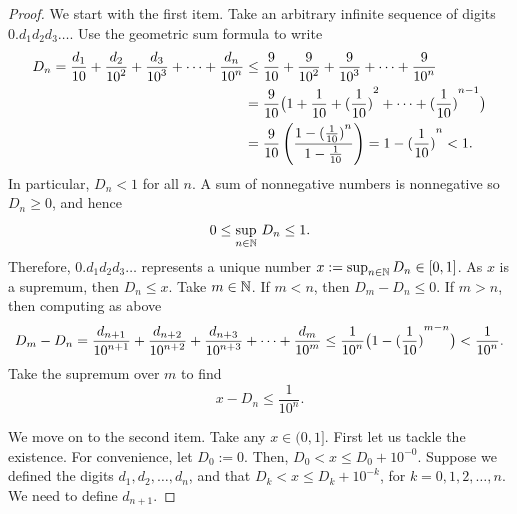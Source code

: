 \begin{proof}
We start with the first item.  Take an arbitrary infinite sequence of
digits $0.d_1d_2d_3\ldots$.  Use the geometric sum formula to write
\begin{equation*}
\begin{split}
D_n =
\frac{d_1}{10} + 
\frac{d_2}{{10}^2} + 
\frac{d_3}{{10}^3} + 
\cdots +
\frac{d_n}{{10}^n} 
& \leq
\frac{9}{10} + 
\frac{9}{{10}^2} + 
\frac{9}{{10}^3} + 
\cdots +
\frac{9}{{10}^n} 
\\
& =
\frac{9}{10}
\bigl( 1 + \nicefrac{1}{10} + 
{(\nicefrac{1}{10})}^2 + \cdots + 
{(\nicefrac{1}{10})}^{n-1} \bigr)
\\
& =
\frac{9}{10}
\left(
\frac{1-{(\nicefrac{1}{10})}^{n}}{1-\nicefrac{1}{10}}
\right)
= 1-{(\nicefrac{1}{10})}^{n}
< 1 .
\end{split}
\end{equation*}
In particular, $D_n < 1$ for all $n$.  A sum of nonnegative numbers is
nonnegative so $D_n \geq 0$, and hence
\begin{equation*}
0 \leq \sup_{n\in \N} \, D_n \leq 1 .
\end{equation*}
Therefore, $0.d_1d_2d_3\ldots$ represents a unique number $x := \sup_{n\in
\N} D_n \in [0,1]$.
As $x$ is a supremum, then $D_n \leq x$.
Take $m \in \N$.  If $m < n$, then $D_m - D_n \leq 0$.  If $m > n$, then
computing as above
\begin{equation*}
D_m - D_n
=
\frac{d_{n+1}}{{10}^{n+1}} + 
\frac{d_{n+2}}{{10}^{n+2}} + 
\frac{d_{n+3}}{{10}^{n+3}} + 
\cdots +
\frac{d_{m}}{{10}^m} 
\leq
\frac{1}{{10}^{n}}
\bigl(
1-{(\nicefrac{1}{10})}^{m-n}
\bigr)
<
\frac{1}{{10}^{n}} .
\end{equation*}
Take the supremum over $m$ to find
\begin{equation*}
x - D_n
\leq
\frac{1}{{10}^{n}} .
\end{equation*}

We move on to the
second item.  Take any $x \in (0,1]$.
First let us tackle the existence.
For convenience, let $D_0 := 0$.
Then,
$D_0 < x \leq D_0 + {10}^{-0}$.
Suppose we defined the digits $d_1,d_2,\ldots,d_n$,
and that 
$D_k < x \leq D_k + {10}^{-k}$, for $k=0,1,2,\ldots,n$.  We need to define $d_{n+1}$.


\end{proof}
